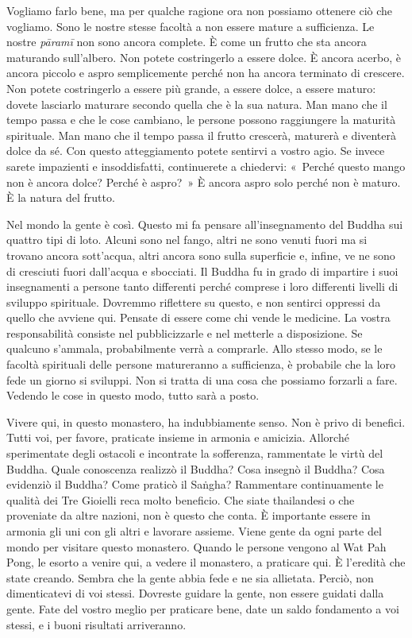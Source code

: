 Vogliamo farlo bene, ma per qualche ragione ora non possiamo ottenere
ciò che vogliamo. Sono le nostre stesse facoltà a non essere mature a
sufficienza. Le nostre \emph{pāramī} non sono ancora complete. È come un
frutto che sta ancora maturando sull'albero. Non potete costringerlo a
essere dolce. È ancora acerbo, è ancora piccolo e aspro semplicemente
perché non ha ancora terminato di crescere. Non potete costringerlo a
essere più grande, a essere dolce, a essere maturo: dovete lasciarlo
maturare secondo quella che è la sua natura. Man mano che il tempo passa
e che le cose cambiano, le persone possono raggiungere la maturità
spirituale. Man mano che il tempo passa il frutto crescerà, maturerà e
diventerà dolce da sé. Con questo atteggiamento potete sentirvi a vostro
agio. Se invece sarete impazienti e insoddisfatti, continuerete a
chiedervi: «~Perché questo mango non è ancora dolce? Perché è aspro?~» È
ancora aspro solo perché non è maturo. È la natura del frutto.

Nel mondo la gente è così. Questo mi fa pensare all'insegnamento del
Buddha sui quattro tipi di loto. Alcuni sono nel fango, altri ne sono
venuti fuori ma si trovano ancora sott'acqua, altri ancora sono sulla
superficie e, infine, ve ne sono di cresciuti fuori dall'acqua e
sbocciati. Il Buddha fu in grado di impartire i suoi insegnamenti a
persone tanto differenti perché comprese i loro differenti livelli di
sviluppo spirituale. Dovremmo riflettere su questo, e non sentirci
oppressi da quello che avviene qui. Pensate di essere come chi vende le
medicine. La vostra responsabilità consiste nel pubblicizzarle e nel
metterle a disposizione. Se qualcuno s'ammala, probabilmente verrà a
comprarle. Allo stesso modo, se le facoltà spirituali delle persone
matureranno a sufficienza, è probabile che la loro fede un giorno si
sviluppi. Non si tratta di una cosa che possiamo forzarli a fare.
Vedendo le cose in questo modo, tutto sarà a posto.

Vivere qui, in questo monastero, ha indubbiamente senso. Non è privo di
benefici. Tutti voi, per favore, praticate insieme in armonia e
amicizia. Allorché sperimentate degli ostacoli e incontrate la
sofferenza, rammentate le virtù del Buddha. Quale conoscenza realizzò il
Buddha? Cosa insegnò il Buddha? Cosa evidenziò il Buddha? Come praticò
il Saṅgha? Rammentare continuamente le qualità dei Tre Gioielli reca
molto beneficio. Che siate thailandesi o che proveniate da altre
nazioni, non è questo che conta. È importante essere in armonia gli uni
con gli altri e lavorare assieme. Viene gente da ogni parte del mondo
per visitare questo monastero. Quando le persone vengono al Wat Pah
Pong, le esorto a venire qui, a vedere il monastero, a praticare qui. È
l'eredità che state creando. Sembra che la gente abbia fede e ne sia
allietata. Perciò, non dimenticatevi di voi stessi. Dovreste guidare la
gente, non essere guidati dalla gente. Fate del vostro meglio per
praticare bene, date un saldo fondamento a voi stessi, e i buoni
risultati arriveranno.

